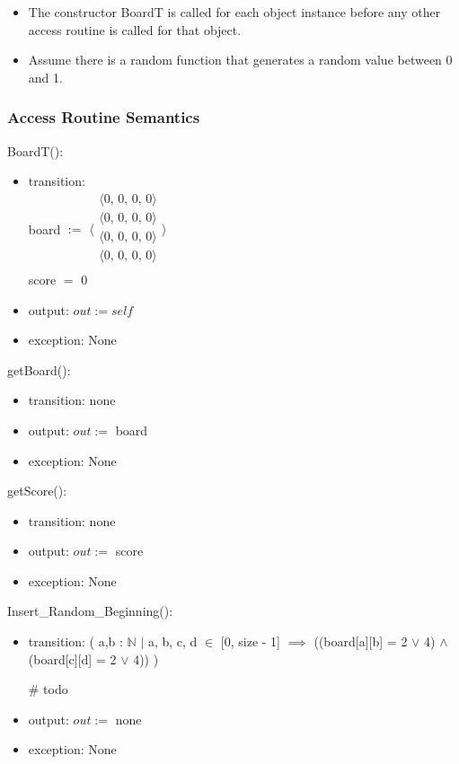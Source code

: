 \documentclass[12pt]{article}
\begin{document}
\begin{itemize}
  \item The constructor BoardT is called for each object instance before any other access routine 
  is called for that object. 
  \item Assume there is a random function that generates a random value between 0 and 1.
\end{itemize}

\subsubsection* {Access Routine Semantics}

BoardT():
\begin{itemize}
\item transition: \\
      board $:=$ 
      $\langle \begin{array}{c}
      \langle \mbox{0, 0, 0, 0} \rangle\\
      \langle \mbox{0, 0, 0, 0}\rangle\\
      \langle \mbox{0, 0, 0, 0}\rangle\\
      \langle \mbox{0, 0, 0, 0}\rangle\\
      \end{array} \rangle$ \\ 
      score $=$  0
\item output: $out := \mathit{self}$
\item exception: None
\end{itemize}

\noindent getBoard():
\begin{itemize}
\item transition: none
\item output: $out :=$ board
\item exception: None
\end{itemize}

\noindent getScore():
\begin{itemize}
\item transition: none
\item output: $out :=$ score
\item exception: None
\end{itemize}

\noindent Insert\_Random\_Beginning():
\begin{itemize}
\item transition: ( a,b :  $\mathbb{N}$ $\mid$ a, b, c, d $\in$ [0, size - 1] $\implies$ ((board[a][b] = 2 $\lor$ 4) $\land$ (board[c][d] = 2 $\lor$ 4))  )\\

\medskip

\# todo
\item output: $out :=$ none
\item exception: None
\end{itemize}
\end{document}
